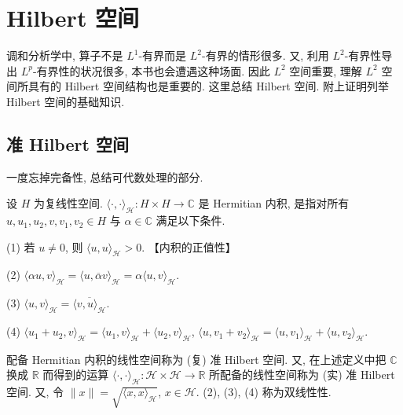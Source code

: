 
\section{Hilbert 空间}\label{sec:2.5}

























调和分析学中, 算子不是 $L^{1}$-有界而是 $L^{2}$-有界的情形很多. 又, 利用 $L^{2}$-有界性导出 $L^{p}$-有界性的状况很多, 本书也会遭遇这种场面. 因此 $L^{2}$ 空间重要, 理解 $L^{2}$ 空间所具有的 Hilbert 空间结构也是重要的. 这里总结 Hilbert 空间. 附上证明列举 Hilbert 空间的基础知识.

\subsection*{准 Hilbert 空间}

一度忘掉完备性, 总结可代数处理的部分.

\begin{definition}\label{def:2.21}
设 $H$ 为复线性空间. $\langle \cdot, \cdot \rangle_{\mathcal{H}}: H \times H \to \mathbb{C}$ 是 Hermitian 内积, 是指对所有 $u, u_{1}, u_{2}, v, v_{1}, v_{2} \in H$ 与 $\alpha \in \mathbb{C}$ 满足以下条件.

(1) 若 $u \neq 0$, 则 $\langle u, u \rangle_{\mathcal{H}} > 0$. 【内积的正值性】

(2) $\langle \alpha u, v \rangle_{\mathcal{H}} = \langle u, \overline{\alpha}v \rangle_{\mathcal{H}} = \alpha\langle u, v \rangle_{\mathcal{H}}$.

(3) $\langle u, v \rangle_{\mathcal{H}} = \overline{\langle v, u \rangle_{\mathcal{H}}}$.

(4) $\langle u_{1} + u_{2}, v \rangle_{\mathcal{H}} = \langle u_{1}, v \rangle_{\mathcal{H}} + \langle u_{2}, v \rangle_{\mathcal{H}}$, $\langle u, v_{1} + v_{2} \rangle_{\mathcal{H}} = \langle u, v_{1} \rangle_{\mathcal{H}} + \langle u, v_{2} \rangle_{\mathcal{H}}$.

配备 Hermitian 内积的线性空间称为 (复) 准 Hilbert 空间. 又, 在上述定义中把 $\mathbb{C}$ 换成 $\mathbb{R}$ 而得到的运算 $\langle \cdot, \cdot \rangle_{\mathcal{H}}: \mathcal{H} \times \mathcal{H} \to \mathbb{R}$ 所配备的线性空间称为 (实) 准 Hilbert 空间. 又, 令 $\|x\| = \sqrt{\langle x, x \rangle_{\mathcal{H}}}$, $x \in \mathcal{H}$. (2), (3), (4) 称为双线性性.
\end{definition}


